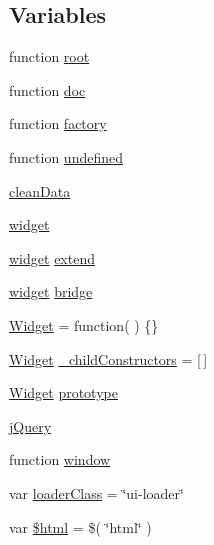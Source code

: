 \subsection*{Variables}
\begin{DoxyCompactItemize}
\item 
function \hyperlink{jquery_8mobile-1_83_81_8js_a11a10a6834f3c54a5380f4ff04d002a9}{root}
\item 
function \hyperlink{jquery_8mobile-1_83_81_8js_a6966a4bf23931ad4f323b1b8c1e1801f}{doc}
\item 
function \hyperlink{jquery_8mobile-1_83_81_8js_abf075bdbe59fd2c3336ed052c9c72b31}{factory}
\item 
function \hyperlink{jquery_8mobile-1_83_81_8js_a08113a236cc18d2a9d5ce27e638012be}{undefined}
\item 
\hyperlink{jquery_8mobile-1_83_81_8js_a4d80c5737711144fedbc444c477b4ae1}{clean\+Data}
\item 
\hyperlink{jquery_8mobile-1_83_81_8js_a60d5947424f4fcd4ca9ed05e6dc43227}{widget}
\item 
\hyperlink{jquery_8mobile-1_83_81_8js_ac4a01edf7e49cc35291bb23e78a07acf}{widget} \hyperlink{jquery_8mobile-1_83_81_8js_abe357548e1025880076c7e839a3e5755}{extend}
\item 
\hyperlink{jquery_8mobile-1_83_81_8js_ac4a01edf7e49cc35291bb23e78a07acf}{widget} \hyperlink{jquery_8mobile-1_83_81_8js_a8b5680c375ebc550c53429eb461391ac}{bridge}
\item 
\hyperlink{jquery_8mobile-1_83_81_8js_afc4c2169b499b3ea4e8c3e0924a3df4f}{Widget} = function( ) \{\}
\item 
\hyperlink{jquery_8mobile-1_83_81_8js_afc4c2169b499b3ea4e8c3e0924a3df4f}{Widget} \hyperlink{jquery_8mobile-1_83_81_8js_aac56b10a0274ff1caf5926d2f59e64fd}{\+\_\+child\+Constructors} = \mbox{[}$\,$\mbox{]}
\item 
\hyperlink{jquery_8mobile-1_83_81_8js_afc4c2169b499b3ea4e8c3e0924a3df4f}{Widget} \hyperlink{jquery_8mobile-1_83_81_8js_acd6098decfaf355a91ef27debf39295f}{prototype}
\item 
\hyperlink{jquery_8mobile-1_83_81_8js_a2b1d6f9c448e3ce72f4e1865d6e38d2c}{j\+Query}
\item 
function \hyperlink{jquery_8mobile-1_83_81_8js_ad55530ae1e5978df8e721017c1fc8466}{window}
\item 
var \hyperlink{jquery_8mobile-1_83_81_8js_add4f0a56858387e39a5624948ff5455f}{loader\+Class} = \char`\"{}ui-\/loader\char`\"{}
\item 
var \hyperlink{jquery_8mobile-1_83_81_8js_a120bcf7e39205eb0428f69fb58f7032e}{\$html} = \$( \char`\"{}html\char`\"{} )

\end{DoxyCompactItemize}
